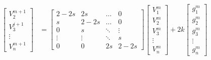 \begin{align*}
\begin{bmatrix}
    V_2^{m+1} \\
    V_3^{j+1} \\
    \vdots    \\
    V_n^{m+1}
\end{bmatrix}
&=
\begin{bmatrix}
    2-2s   & 2s     & \dots  & 0 \\
    s      & 2-2s   & \dots  & 0 \\
    0      & s      & \ddots & \vdots \\
    \vdots & \vdots & \ddots & s   \\
    0      & 0      & 2s     & 2-2s
\end{bmatrix}
\begin{bmatrix}
    V_1^{m} \\
    V_2^{m} \\
    V_3^{m} \\
    \vdots  \\
    V_n^{m}
\end{bmatrix} + 2k
\begin{bmatrix}
    g_1^{m} \\
    g_2^{m} \\
    g_3^{m} \\
    \vdots  \\
    g_n^{m}
\end{bmatrix}
\end{align*}
